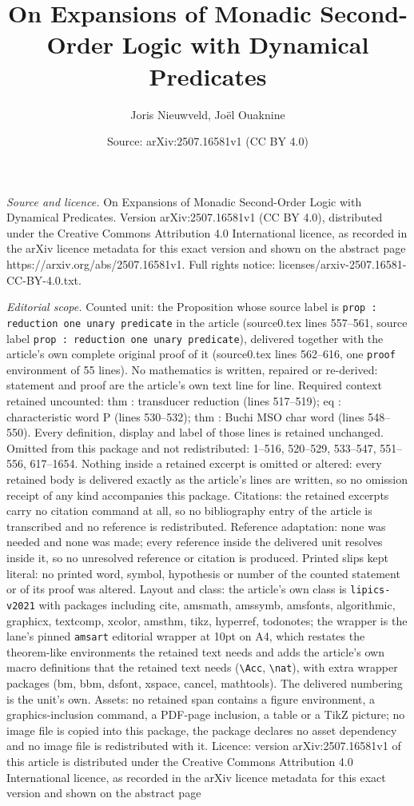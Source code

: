 \documentclass[10pt,a4paper]{amsart}
\title[On Expansions of Monadic Second-Order Logic with Dynamical P]{On Expansions of Monadic Second-Order Logic with Dynamical Predicates}
\author{Joris Nieuwveld, Jo\"el Ouaknine}
\date{Source: arXiv:2507.16581v1 (CC BY 4.0)}
\begin{document}
\maketitle

\noindent\emph{Source and licence.} On Expansions of Monadic Second-Order Logic with Dynamical Predicates. Version arXiv:2507.16581v1 (CC BY 4.0), distributed under the Creative Commons Attribution 4.0 International licence, as recorded in the arXiv licence metadata for this exact version and shown on the abstract page https://arxiv.org/abs/2507.16581v1. Full rights notice: licenses/arxiv-2507.16581-CC-BY-4.0.txt.\par\smallskip

\noindent\textit{Editorial scope.} Counted unit: the Proposition whose source label is \texttt{prop : reduction one unary predicate} in the article (source0.tex lines 557--561, source label \texttt{prop : reduction one unary predicate}), delivered together with the article's own complete original proof of it (source0.tex lines 562--616, one \texttt{proof} environment of 55 lines). No mathematics is written, repaired or re-derived: statement and proof are the article's own text line for line. Required context retained uncounted: thm : transducer reduction (lines 517--519); eq : characteristic word P (lines 530--532); thm : Buchi MSO char word (lines 548--550). Every definition, display and label of those lines is retained unchanged. Omitted from this package and not redistributed: 1--516, 520--529, 533--547, 551--556, 617--1654. Nothing inside a retained excerpt is omitted or altered: every retained body is delivered exactly as the article's lines are written, so no omission receipt of any kind accompanies this package. Citations: the retained excerpts carry no citation command at all, so no bibliography entry of the article is transcribed and no reference is redistributed. Reference adaptation: none was needed and none was made; every reference inside the delivered unit resolves inside it, so no unresolved reference or citation is produced. Printed slips kept literal: no printed word, symbol, hypothesis or number of the counted statement or of its proof was altered. Layout and class: the article's own class is \texttt{lipics-v2021} with packages including cite, amsmath, amssymb, amsfonts, algorithmic, graphicx, textcomp, xcolor, amsthm, tikz, hyperref, todonotes; the wrapper is the lane's pinned \texttt{amsart} editorial wrapper at 10pt on A4, which restates the theorem-like environments the retained text needs and adds the article's own macro definitions that the retained text needs (\texttt{\textbackslash Acc}, \texttt{\textbackslash nat}), with extra wrapper packages (bm, bbm, dsfont, xspace, cancel, mathtools). The delivered numbering is the unit's own. Assets: no retained span contains a figure environment, a graphics-inclusion command, a PDF-page inclusion, a table or a TikZ picture; no image file is copied into this package, the package declares no asset dependency and no image file is redistributed with it. Licence: version arXiv:2507.16581v1 of this article is distributed under the Creative Commons Attribution 4.0 International licence, as recorded in the arXiv licence metadata for this exact version and shown on the abstract page 
\end{document}
